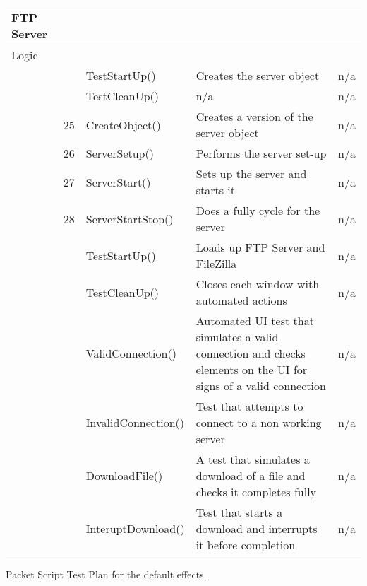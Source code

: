 \begin{longtable}{| p{2cm} | p{0.5cm} | p{4cm} | p{5cm} | p{3cm} |}
		\bf{FTP Server} &&&& \\ \hline
		
		Logic &&&& \\ \hline
		&& TestStartUp() & Creates the server object & n/a \\ \hline
		&& TestCleanUp() & n/a & n/a \\ \hline
		&25& CreateObject() & Creates a version of the server object & n/a \\ \hline
		&26& ServerSetup() & Performs the server set-up & n/a \\ \hline
		&27& ServerStart() & Sets up the server and starts it & n/a \\ \hline
		&28& ServerStartStop() & Does a fully cycle for the server & n/a \\ \hline
		
		&& TestStartUp() & Loads up FTP Server and FileZilla & n/a \\ \hline
		&& TestCleanUp() & Closes each window with automated actions & n/a \\ \hline
		&& ValidConnection() & Automated UI test that simulates a valid connection and checks elements on the UI for signs of a valid connection & n/a \\ \hline
		&& InvalidConnection() & Test that attempts to connect to a non working server & n/a \\ \hline
		&& DownloadFile() & A test that simulates a download of a file and checks it completes fully & n/a \\ \hline
		&& InteruptDownload() & Test that starts a download and interrupts it before completion & n/a \\ \hline
	\hline
\end{longtable}

Packet Script Test Plan for the default effects.

